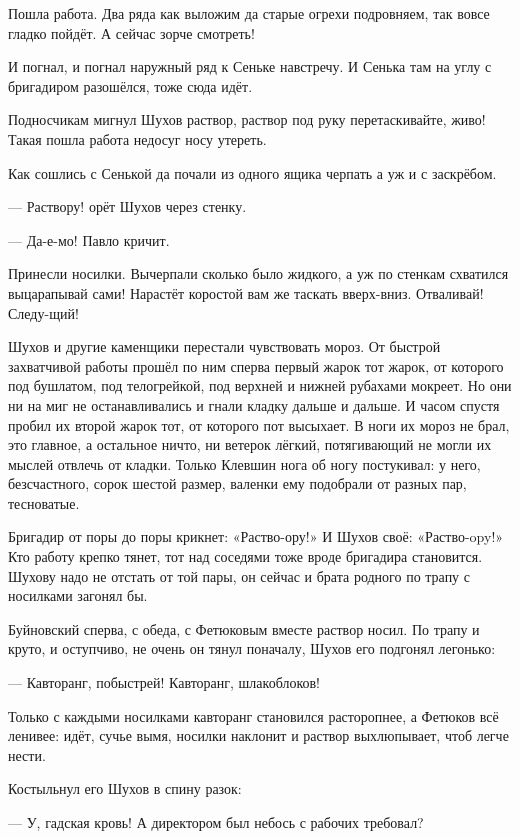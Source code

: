 Пошла работа. Два ряда как выложим да старые огрехи подровняем, так вовсе гладко пойдёт. А
сейчас \dash зорче смотреть!

И погнал, и погнал наружный ряд к Сеньке навстречу. И Сенька там на углу с бригадиром
разошёлся, тоже сюда идёт.

Подносчикам мигнул Шухов \dash раствор, раствор под руку перетаскивайте, живо! Такая пошла
работа \dash недосуг носу утереть.

Как сошлись с Сенькой да почали из одного ящика черпать \dash а уж и с заскрёбом.

--- Раствору! \dash орёт Шухов через стенку.

--- Да-е-мо! \dash Павло кричит.

Принесли носилки. Вычерпали сколько было жидкого, а уж по стенкам схватился \dash выцарапывай
сами! Нарастёт коростой \dash вам же таскать вверх-вниз. Отваливай! Следу-щий!

Шухов и другие каменщики перестали чувствовать мороз. От быстрой захватчивой работы прошёл
по ним сперва первый жарок \dash тот жарок, от которого под бушлатом, под телогрейкой, под
верхней и нижней рубахами мокреет. Но они ни на миг не останавливались и гнали кладку дальше
и дальше. И часом спустя пробил их второй жарок \dash тот, от которого пот высыхает. В ноги их
мороз не брал, это главное, а остальное ничто, ни ветерок лёгкий, потягивающий \dash не могли их
мыслей отвлечь от кладки. Только Клевшин нога об ногу постукивал: у него, безсчастного, сорок
шестой размер, валенки ему подобрали от разных пар, тесноватые.

Бригадир от поры до поры крикнет: «Раство-ору!» И Шухов своё: «Раство-opy!» Кто работу крепко
тянет, тот над соседями тоже вроде бригадира становится. Шухову надо не отстать от той пары,
он сейчас и брата родного по трапу с носилками загонял бы.

Буйновский сперва, с обеда, с Фетюковым вместе раствор носил. По трапу и круто, и оступчиво,
не очень он тянул поначалу, Шухов его подгонял легонько:

--- Кавторанг, побыстрей! Кавторанг, шлакоблоков!

Только с каждыми носилками кавторанг становился расторопнее, а Фетюков всё ленивее: идёт,
сучье вымя, носилки наклонит и раствор выхлюпывает, чтоб легче нести.

Костыльнул его Шухов в спину разок:

--- У, гадская кровь! А директором был \dash небось с рабочих требовал?

